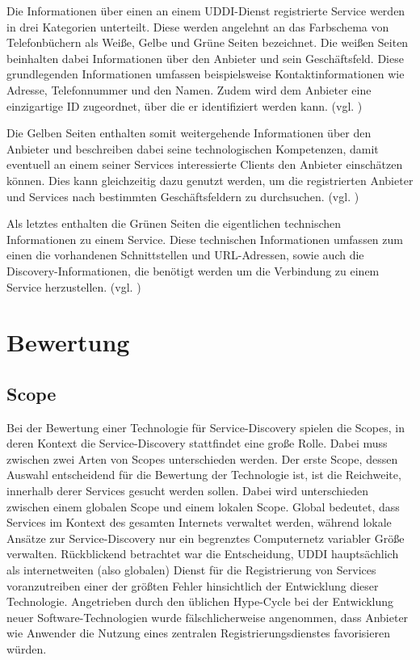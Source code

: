 \documentclass[conference,compsoc]{IEEEtran}
\begin{document}
Die Informationen über einen an einem UDDI-Dienst registrierte Service werden in drei Kategorien unterteilt. Diese werden angelehnt an das Farbschema von Telefonbüchern als Weiße, Gelbe und Grüne Seiten bezeichnet. Die weißen Seiten beinhalten dabei Informationen über den Anbieter und sein Geschäftsfeld. Diese grundlegenden Informationen umfassen beispielsweise Kontaktinformationen wie Adresse, Telefonnummer und den Namen. Zudem wird dem Anbieter eine einzigartige ID zugeordnet, über die er identifiziert werden kann. (vgl. \cite{UDDI-implementation})

Die Gelben Seiten enthalten somit weitergehende Informationen über den Anbieter und beschreiben dabei seine technologischen Kompetenzen, damit eventuell an einem seiner Services interessierte Clients den Anbieter einschätzen können. Dies kann gleichzeitig dazu genutzt werden, um die registrierten Anbieter und Services nach bestimmten Geschäftsfeldern zu durchsuchen. (vgl. \cite{UDDI-implementation})

Als letztes enthalten die Grünen Seiten die eigentlichen technischen Informationen zu einem Service. Diese technischen Informationen umfassen zum einen die vorhandenen Schnittstellen und URL-Adressen, sowie auch die Discovery-Informationen, die benötigt werden um die Verbindung zu einem Service herzustellen. (vgl. \cite{UDDI-implementation})

\section{Bewertung}

\subsection{Scope}

Bei der Bewertung einer Technologie für Service-Discovery spielen die Scopes, in deren Kontext die Service-Discovery stattfindet eine große Rolle. Dabei muss zwischen zwei Arten von Scopes unterschieden werden.
Der erste Scope, dessen Auswahl entscheidend für die Bewertung der Technologie ist, ist die Reichweite, innerhalb derer Services gesucht werden sollen. Dabei wird unterschieden zwischen einem globalen Scope und einem lokalen Scope. Global bedeutet, dass Services im Kontext des gesamten Internets verwaltet werden, während lokale Ansätze zur Service-Discovery nur ein begrenztes Computernetz variabler Größe verwalten. Rückblickend betrachtet war die Entscheidung, UDDI hauptsächlich als internetweiten (also globalen) Dienst für die Registrierung von Services voranzutreiben einer der größten Fehler hinsichtlich der Entwicklung dieser Technologie. Angetrieben durch den üblichen Hype-Cycle bei der Entwicklung neuer Software-Technologien wurde fälschlicherweise angenommen, dass Anbieter wie Anwender die Nutzung eines zentralen Registrierungsdienstes favorisieren würden.
\end{document}
